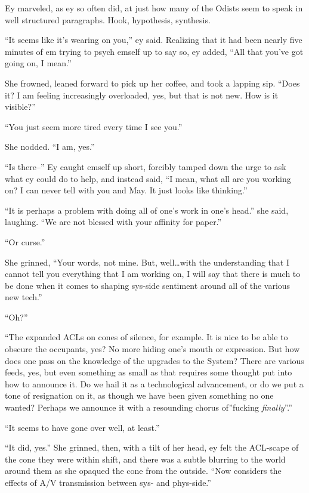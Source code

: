 Ey marveled, as ey so often did, at just how many of the Odists seem to speak in well structured paragraphs. Hook, hypothesis, synthesis.

``It seems like it's wearing on you,'' ey said. Realizing that it had been nearly five minutes of em trying to psych emself up to say so, ey added, ``All that you've got going on, I mean.''

She frowned, leaned forward to pick up her coffee, and took a lapping sip. ``Does it? I am feeling increasingly overloaded, yes, but that is not new. How is it visible?''

``You just seem more tired every time I see you.''

She nodded. ``I am, yes.''

``Is there--'' Ey caught emself up short, forcibly tamped down the urge to ask what ey could do to help, and instead said, ``I mean, what all are you working on? I can never tell with you and May. It just looks like thinking.''

``It is perhaps a problem with doing all of one's work in one's head.'' she said, laughing. ``We are not blessed with your affinity for paper.''

``Or curse.''

She grinned, ``Your words, not mine. But, well\ldots with the understanding that I cannot tell you everything that I am working on, I will say that there is much to be done when it comes to shaping sys-side sentiment around all of the various new tech.''

``Oh?''

``The expanded ACLs on cones of silence, for example. It is nice to be able to obscure the occupants, yes? No more hiding one's mouth or expression. But how does one pass on the knowledge of the upgrades to the System? There are various feeds, yes, but even something as small as that requires some thought put into how to announce it. Do we hail it as a technological advancement, or do we put a tone of resignation on it, as though we have been given something no one wanted? Perhaps we announce it with a resounding chorus of''fucking \emph{finally}''.''

``It seems to have gone over well, at least.''

``It did, yes.'' She grinned, then, with a tilt of her head, ey felt the ACL-scape of the cone they were within shift, and there was a subtle blurring to the world around them as she opaqued the cone from the outside. ``Now considers the effects of A/V transmission between sys- and phys-side.''


